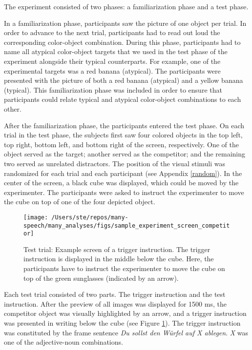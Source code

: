 \documentclass[
  12pt,
]{article}
\begin{document}
The experiment consisted of two phases: a familiarization phase and a test phase.

In a familiarization phase, participants saw the picture of one object per trial.
In order to advance to the next trial, participants had to read out loud the corresponding color-object combination.
During this phase, participants had to name all atypical color-object targets that we used in the test phase of the experiment alongside their typical counterparts.
For example, one of the experimental targets was a red banana (atypical).
The participants were presented with the picture of both a red banana (atypical) and a yellow banana (typical).
This familiarization phase was included in order to ensure that participants could relate typical and atypical color-object combinations to each other.

After the familiarization phase, the participants entered the test phase.
On each trial in the test phase, the subjects first saw four colored objects in the top left, top right, bottom left, and bottom right of the screen, respectively.
One of the object served as the target; another served as the competitor; and the remaining two served as unrelated distractors.
The position of the visual stimuli was randomized for each trial and each participant (see Appendix \ref{random}).
In the center of the screen, a black cube was displayed, which could be moved by the experimenter.
The participants were asked to instruct the experimenter to move the cube on top of one of the four depicted object.

\begin{figure}[tbp]

{\centering \texttt{[image: /Users/ste/repos/many-speech/many\_analyses/figs/sample\_experiment\_screen\_competitor]} 

}

\caption{Test trial: Example screen of a trigger instruction. The trigger instruction is displayed in the middle below the cube. Here, the participants have to instruct the experimenter to move the cube on top of the green sunglasses (indicated by an arrow).}\label{fig:image1}
\end{figure}

Each test trial consisted of two parts.
The trigger instruction and the test instruction.
After the preview of all images was displayed for 1500 ms, the competitor object was visually highlighted by an arrow, and a trigger instruction was presented in writing below the cube (see Figure \ref{fig:image1}).
The trigger instruction was constituted by the frame sentence \emph{Du sollst den Würfel auf X ablegen}.
\emph{X} was one of the adjective-noun combinations.
\end{document}
